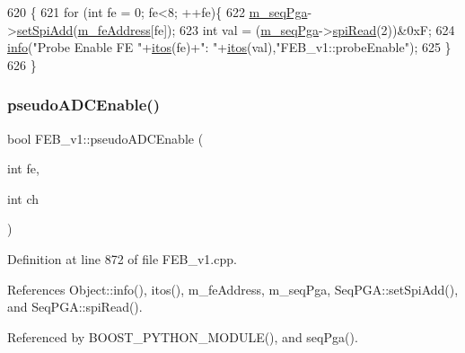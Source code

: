 \begin{DoxyCode}
620                         \{
621   \textcolor{keywordflow}{for} (\textcolor{keywordtype}{int} fe = 0; fe<8; ++fe)\{
622     \hyperlink{classFEB__v1_a6c7804ac86796f233a8393043adf2e77}{m\_seqPga}->\hyperlink{classSeqPGA_ac998ce3a6d9b5f2e88cc8393f8c1df53}{setSpiAdd}(\hyperlink{classFEB__v1_a4e1945c2d5b434125f375e9d0fc6d99f}{m\_feAddress}[fe]);
623     \textcolor{keywordtype}{int} val = (\hyperlink{classFEB__v1_a6c7804ac86796f233a8393043adf2e77}{m\_seqPga}->\hyperlink{classSeqPGA_ab3d0e5e5d4014bc7a92588a76b8713d4}{spiRead}(2))&0xF;
624     \hyperlink{classObject_a644fd329ea4cb85f54fa6846484b84a8}{info}(\textcolor{stringliteral}{"Probe Enable FE "}+\hyperlink{Tools_8h_af330027dbdafb9a30768b3613c553e60}{itos}(fe)+\textcolor{stringliteral}{": "}+\hyperlink{Tools_8h_af330027dbdafb9a30768b3613c553e60}{itos}(val),\textcolor{stringliteral}{"FEB\_v1::probeEnable"});
625   \}
626 \}
\end{DoxyCode}
\mbox{\label{classFEB__v1_aeb6c988faf48d93637ef669c54e25223}} 
\subsubsection{\texorpdfstring{pseudo\+A\+D\+C\+Enable()}{pseudoADCEnable()}}
{\footnotesize\ttfamily bool F\+E\+B\+\_\+v1\+::pseudo\+A\+D\+C\+Enable (\begin{DoxyParamCaption}\item[{int}]{fe,  }\item[{int}]{ch }\end{DoxyParamCaption})}



Definition at line 872 of file F\+E\+B\+\_\+v1.\+cpp.



References Object\+::info(), itos(), m\+\_\+fe\+Address, m\+\_\+seq\+Pga, Seq\+P\+G\+A\+::set\+Spi\+Add(), and Seq\+P\+G\+A\+::spi\+Read().



Referenced by B\+O\+O\+S\+T\+\_\+\+P\+Y\+T\+H\+O\+N\+\_\+\+M\+O\+D\+U\+L\+E(), and seq\+Pga().


